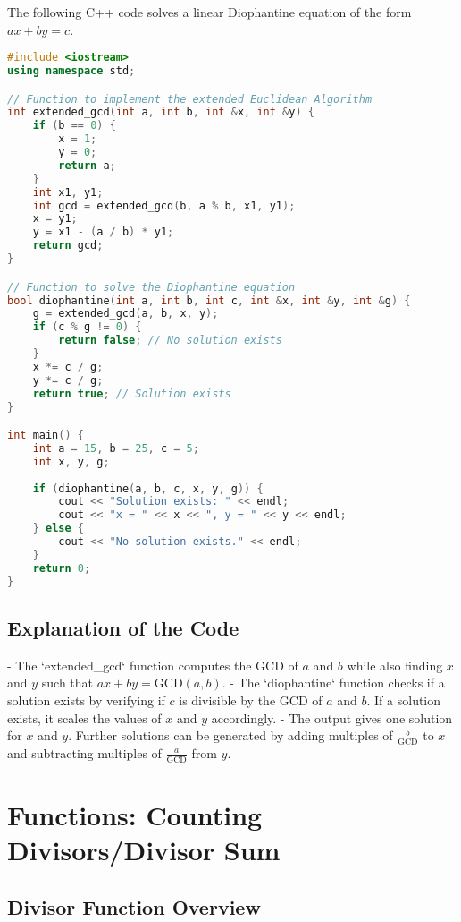 \documentclass[10pt,a4paper]{article}
\begin{document}
The following C++ code solves a linear Diophantine equation of the form \(ax + by = c\).

\begin{lstlisting}[language=C++, caption={Solving Linear Diophantine Equations}, mathescape=true]
#include <iostream>
using namespace std;

// Function to implement the extended Euclidean Algorithm
int extended_gcd(int a, int b, int &x, int &y) {
    if (b == 0) {
        x = 1;
        y = 0;
        return a;
    }
    int x1, y1;
    int gcd = extended_gcd(b, a % b, x1, y1);
    x = y1;
    y = x1 - (a / b) * y1;
    return gcd;
}

// Function to solve the Diophantine equation
bool diophantine(int a, int b, int c, int &x, int &y, int &g) {
    g = extended_gcd(a, b, x, y);
    if (c % g != 0) {
        return false; // No solution exists
    }
    x *= c / g;
    y *= c / g;
    return true; // Solution exists
}

int main() {
    int a = 15, b = 25, c = 5;
    int x, y, g;
    
    if (diophantine(a, b, c, x, y, g)) {
        cout << "Solution exists: " << endl;
        cout << "x = " << x << ", y = " << y << endl;
    } else {
        cout << "No solution exists." << endl;
    }
    return 0;
}
\end{lstlisting}

\subsection*{Explanation of the Code}

- The `extended_gcd` function computes the GCD of \(a\) and \(b\) while also finding \(x\) and \(y\) such that \(ax + by = \text{GCD}(a, b)\).
- The `diophantine` function checks if a solution exists by verifying if \(c\) is divisible by the GCD of \(a\) and \(b\). If a solution exists, it scales the values of \(x\) and \(y\) accordingly.
- The output gives one solution for \(x\) and \(y\). Further solutions can be generated by adding multiples of \(\frac{b}{\text{GCD}}\) to \(x\) and subtracting multiples of \(\frac{a}{\text{GCD}}\) from \(y\).



\section*{Functions: Counting Divisors/Divisor Sum}

\subsection*{Divisor Function Overview}
\end{document}
